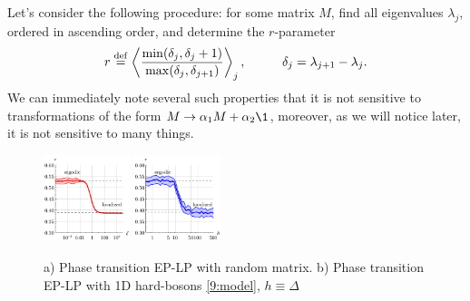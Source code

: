 Let's consider the following procedure: for some matrix $M$, find all eigenvalues $\lambda_j$, ordered in ascending order, and determine the $r$-parameter \cite{wei_characterization_2020}
\begin{equation}
    r \overset{\mathrm{def}}{=}  \left\langle \frac{\min(\delta_j, \delta_j+1)}{\max(\delta_j, \delta_{j+1})} \right\rangle_j,
    \hspace{10 mm} 
    \delta_j = \lambda_{j+1}-\lambda_j.
    \label{eq:rparam}
\end{equation}
We can immediately note several such properties that it is not sensitive to transformations of the form $M \to \alpha_1 M + \alpha_2 \1$, moreover, as we will notice later, it is not sensitive to many things.


\begin{figure}[h]
    \centering
    \includegraphics[width=0.225\textwidth]{imgs/erg_reg_add1.pdf}
    \hspace{10 mm} 
    \includegraphics[width=0.225\textwidth]{imgs/erg_reg_add2.pdf}
    \caption{a) Phase transition EP-LP with random matrix. b)  Phase transition EP-LP with 1D hard-bosons \eqref{9:model}, $h \equiv \Delta$}
    \label{fig:rxi}
\end{figure}


